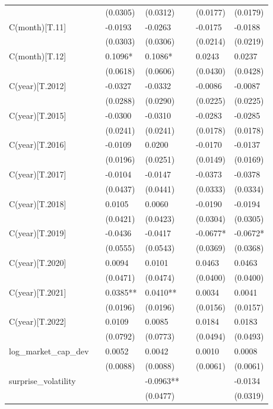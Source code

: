 \begin{tabular}{lllllll}
 &  & (0.0305) & (0.0312) &  & (0.0177) & (0.0179) \\
C(month)[T.11] &  & -0.0193 & -0.0263 &  & -0.0175 & -0.0188 \\
 &  & (0.0303) & (0.0306) &  & (0.0214) & (0.0219) \\
C(month)[T.12] &  & 0.1096* & 0.1086* &  & 0.0243 & 0.0237 \\
 &  & (0.0618) & (0.0606) &  & (0.0430) & (0.0428) \\
C(year)[T.2012] &  & -0.0327 & -0.0332 &  & -0.0086 & -0.0087 \\
 &  & (0.0288) & (0.0290) &  & (0.0225) & (0.0225) \\
C(year)[T.2015] &  & -0.0300 & -0.0310 &  & -0.0283 & -0.0285 \\
 &  & (0.0241) & (0.0241) &  & (0.0178) & (0.0178) \\
C(year)[T.2016] &  & -0.0109 & 0.0200 &  & -0.0170 & -0.0137 \\
 &  & (0.0196) & (0.0251) &  & (0.0149) & (0.0169) \\
C(year)[T.2017] &  & -0.0104 & -0.0147 &  & -0.0373 & -0.0378 \\
 &  & (0.0437) & (0.0441) &  & (0.0333) & (0.0334) \\
C(year)[T.2018] &  & 0.0105 & 0.0060 &  & -0.0190 & -0.0194 \\
 &  & (0.0421) & (0.0423) &  & (0.0304) & (0.0305) \\
C(year)[T.2019] &  & -0.0436 & -0.0417 &  & -0.0677* & -0.0672* \\
 &  & (0.0555) & (0.0543) &  & (0.0369) & (0.0368) \\
C(year)[T.2020] &  & 0.0094 & 0.0101 &  & 0.0463 & 0.0463 \\
 &  & (0.0471) & (0.0474) &  & (0.0400) & (0.0400) \\
C(year)[T.2021] &  & 0.0385** & 0.0410** &  & 0.0034 & 0.0041 \\
 &  & (0.0196) & (0.0196) &  & (0.0156) & (0.0157) \\
C(year)[T.2022] &  & 0.0109 & 0.0085 &  & 0.0184 & 0.0183 \\
 &  & (0.0792) & (0.0773) &  & (0.0494) & (0.0493) \\
log_market_cap_dev &  & 0.0052 & 0.0042 &  & 0.0010 & 0.0008 \\
 &  & (0.0088) & (0.0088) &  & (0.0061) & (0.0061) \\
surprise_volatility &  &  & -0.0963** &  &  & -0.0134 \\
 &  &  & (0.0477) &  &  & (0.0319) \\

\end{tabular}
